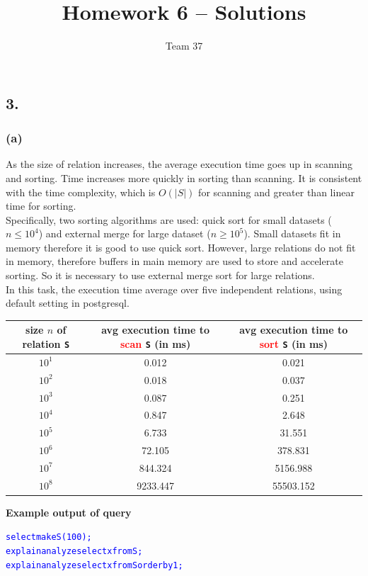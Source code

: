 \documentclass[10pt]{article}
\author{Team 37}
\title{Homework 6 -- Solutions}
\begin{document}
\maketitle
\subsection*{3.}
\subsubsection*{(a)}

As the size of relation increases, the average execution time goes up in scanning and sorting. Time increases more quickly in sorting than scanning. It is consistent with the time complexity, which is $O(|S|)$ for scanning and greater than linear time for sorting.\\
Specifically, two sorting algorithms are used: quick sort for small datasets ($n \leq 10^4$) and external merge for large dataset ($n \geq 10^5$). Small datasets fit in memory therefore it is good to use quick sort. However, large relations do not fit in memory, therefore buffers in main memory are used to store and accelerate sorting. So it is necessary to use external merge sort for large relations.
\\

In this task, the execution time average over five independent relations, using default setting in postgresql.
\begin{center}
\begin{tabular}{c|c|c}
size $n$ of relation {\tt S} & avg execution time to \textcolor{red}{scan} {\tt S} (in ms) &avg execution time to \textcolor{red}{sort} {\tt S} (in ms) \\ \hline
$10^1$&  0.012 &  0.021\\
$10^2$&  0.018 &  0.037\\
$10^3$&  0.087 &  0.251\\
$10^4$&  0.847 &  2.648\\
$10^5$&  6.733 & 31.551\\
$10^6$& 72.105 &378.831\\
$10^7$&844.324 &5156.988\\
$10^8$&9233.447&55503.152\\
\end{tabular}
\end{center}

\textbf{Example output of query}
\begin{center}
\begin{alltt}
\textcolor{blue}{select makeS(100);
explain analyze {select x from S;}
explain analyze {select x from S order by 1;}}
\end{alltt}
\end{center}
\end{document}
